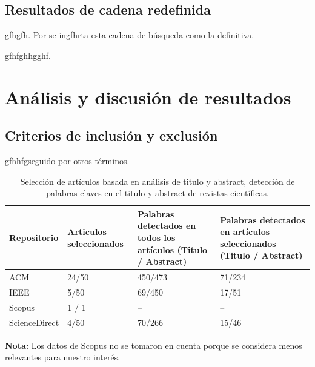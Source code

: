 \documentclass[letterpaper]{article}
\begin{document}
	\subsection{Resultados de cadena redefinida}
	gfhgfh. Por se ingfhrta esta cadena de búsqueda como la definitiva.
		
	gfhfghhgghf.
	
	
	
	\section{Análisis y discusión de resultados}
	\subsection{Criterios de inclusión y exclusión}
	gfhhfgseguido por otros términos.
	\begin{table}[hbtp]
    		\centering
    		\begin{tabular}{p{2cm} p{4cm} p{4cm} p{4cm}}
            \toprule
              Repositorio & Articulos seleccionados & Palabras detectados en todos los artículos (Titulo / Abstract) & Palabras detectados en artículos seleccionados (Titulo / Abstract) \\
            \midrule
                      ACM &                   24/50 &                                            450/473 &                                             71/234 \\
                     IEEE &                    5/50 &                                             69/450 &                                              17/51 \\
                   Scopus &                   1 / 1 &                                                 -- &                                                 -- \\
            ScienceDirect &                    4/50 &                                             70/266 &                                              15/46 \\
            \bottomrule
            \end{tabular}
    		\caption{Selección de artículos basada en análisis de titulo y abstract, detección de palabras claves en el titulo y abstract de revistas científicas.}
    		\textbf{Nota:} Los datos de Scopus no se tomaron en cuenta porque se considera menos relevantes para nuestro interés.
    		\label{seleccion_table}
    \end{table}
    
\end{document}
